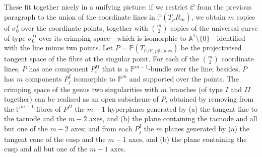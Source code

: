 \documentclass{compositio}
\newcommand{\PP}{\mathbb P}
\newcommand{\Aaff}{\mathbb A}
\theoremstyle{plain}
\theoremstyle{definition}
\theoremstyle{remark}
\begin{document}
These fit together nicely in a unifying picture: if we restrict $\mathcal C$ from the previous paragraph to the union of the coordinate lines in $\PP(T_pR_m)$, we obtain $m$ copies of $\sigma_0^{I}$ over the coordinate points, together with $\binom{m}{2}$ copies of the universal curve of type $\sigma_0^{I\!I}$ over its crimping space - which is isomorphic to $\Aaff^1\setminus\{0\}$ - identified with the line minus two points. Let $P=\PP(T_{\mathcal C/\PP,p|\cup\text{lines}})$ be the projectivised tangent space of the fibre at the singular point. For each of the $\binom{m}{2}$ coordinate lines, $P$ has one component $P^{I\!I}_i$ that is a $\PP^{m-1}$-bundle over the line; besides, $P$ has $m$ components $P^{I}_j$ isomorphic to $\PP^m$ and supported over the points. The crimping space of the genus two singularities with $m$ branches (of type $I$ and $I\!I$ together) can be realised as an open subscheme of $P$, obtained by removing from the $\PP^{m-1}$-fibres of $P^{I\!I}$ the $m-1$ hyperplanes generated by (a) the tangent line to the tacnode and the $m-2$ axes, and (b) the plane containing the tacnode and all but one of the $m-2$ axes; and from each $P^{I}_j$ the $m$ planes generated by (a) the tangent cone of the cusp and the $m-1$ axes, and (b) the plane containing the cusp and all but one of the $m-1$ axes.
\end{document}
